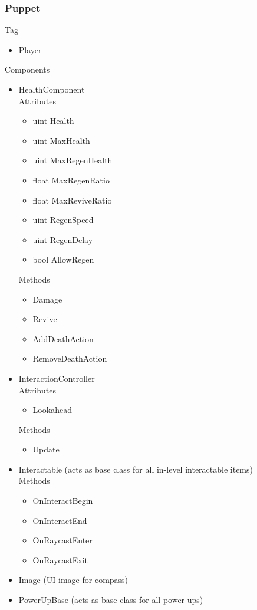 \documentclass[11pt]{article}
\begin{document}
\subsubsection{Puppet}
Tag
\begin{itemize}
\item Player
\end{itemize}
Components
\begin{itemize}
\item HealthComponent
\\Attributes
\begin{itemize}
\item uint Health
\item uint MaxHealth
\item uint MaxRegenHealth
\item float MaxRegenRatio
\item float MaxReviveRatio
\item uint RegenSpeed
\item uint RegenDelay
\item bool AllowRegen
\end{itemize}
Methods
\begin{itemize}
\item Damage
\item Revive
\item AddDeathAction
\item RemoveDeathAction
\end{itemize}
\item InteractionController
\\Attributes
\begin{itemize}
\item Lookahead
\end{itemize}
Methods
\begin{itemize}
\item Update
\end{itemize}
\item Interactable (acts as base class for all in-level interactable items)
\\Methods
\begin{itemize}
\item OnInteractBegin
\item OnInteractEnd
\item OnRaycastEnter
\item OnRaycastExit
\end{itemize}
\item Image (UI image for compass)
\item PowerUpBase (acts as base class for all power-ups)

\end{itemize}
\end{document}
